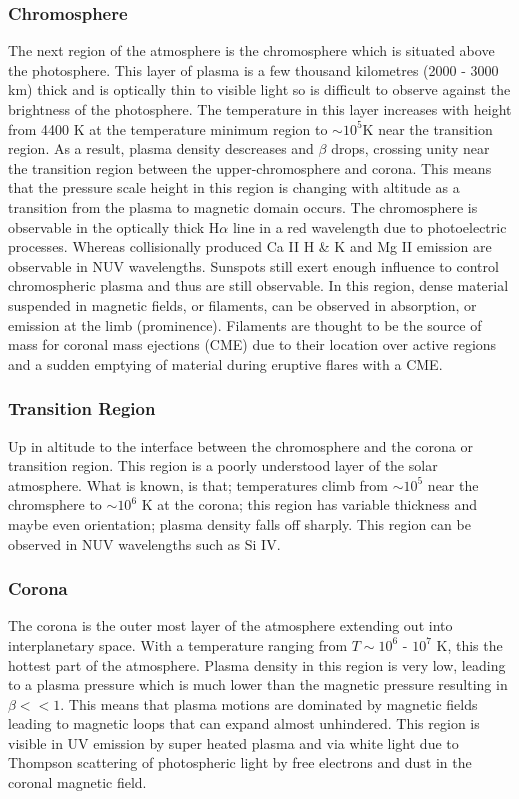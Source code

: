 \subsubsection{Chromosphere}
The next region of the atmosphere is the chromosphere which is situated above the photosphere. This layer of plasma is a few thousand kilometres (2000 - 3000 km) thick and is optically thin to visible light so is difficult to observe against the brightness of the photosphere. The temperature in this layer increases with height from 4400 K at the temperature minimum region to $\sim10^{5}$K near the transition region. As a result, plasma density descreases and $\beta$ drops, crossing unity near the transition region between the upper-chromosphere and corona. This means that the pressure scale height in this region is changing with altitude as a transition from the plasma to magnetic domain occurs. The chromosphere is observable in the optically thick H$\alpha$ line in a red wavelength due to photoelectric processes. Whereas collisionally produced Ca II H & K and Mg II emission are observable in NUV wavelengths. Sunspots still exert enough influence to control chromospheric plasma and thus are still observable. In this region, dense material suspended in magnetic fields, or filaments, can be observed in absorption, or emission at the limb (prominence). Filaments are thought to be the source of mass for coronal mass ejections (CME) due to their location over active regions and a sudden emptying of material during eruptive flares with a CME. 

\subsubsection{Transition Region}
Up in altitude to the interface between the chromosphere and the corona or transition region. This region is a poorly understood layer of the solar atmosphere. What is known, is that; temperatures climb from $\sim10^{5}$ near the chromsphere to $\sim10^{6}$ K at the corona; this region has variable thickness and maybe even orientation; plasma density falls off sharply. This region can be observed in NUV wavelengths such as Si IV.  

\subsubsection{Corona}
The corona is the outer most layer of the atmosphere extending out into interplanetary space.  With a temperature ranging from $T\sim10^{6}$ - $10^{7}$ K, this the hottest part of the atmosphere. Plasma density in this region is very low, leading to a plasma pressure which is much lower than the magnetic pressure resulting in $\beta << 1$. This means that plasma motions are dominated by magnetic fields leading to magnetic loops that can expand almost unhindered. This region is visible in UV emission by super heated plasma and via white light due to Thompson scattering of photospheric light by free electrons and dust in the coronal magnetic field. 



